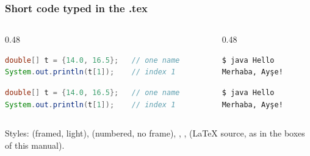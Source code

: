 \documentclass[aspectratio=169,10pt,compress]{beamer}
\begin{document}




\begin{frame}[t,fragile] \frametitle{Short code typed in the .tex}
	\begin{columns}[T]
		\begin{column}{0.48\textwidth}

\begin{texcode}
\begin{lstlisting}[style=codesnippet, language=Java]
double[] t = {14.0, 16.5};   // one name
System.out.println(t[1]);    // index 1
\end{lstlisting}
\end{texcode}

\begin{lstlisting}[style=codesnippet, language=Java]
double[] t = {14.0, 16.5};   // one name
System.out.println(t[1]);    // index 1
\end{lstlisting}

		\end{column}
		\begin{column}{0.48\textwidth}

\begin{texcode}
\begin{lstlisting}[style=terminalstyle,
  backgroundcolor=\color{termbg},
  basicstyle=\ttfamily\footnotesize\color{termfg}]
$ java Hello
Merhaba, Ayşe!
\end{lstlisting}
\end{texcode}

\begin{lstlisting}[style=terminalstyle, backgroundcolor=\color{termbg}, basicstyle=\ttfamily\footnotesize\color{termfg}]
$ java Hello
Merhaba, Ayşe!
\end{lstlisting}

		\end{column}
	\end{columns}

	\small Styles:  (framed, light),  (numbered, no frame),
	, ,  (LaTeX source, as in the boxes of this manual).
\end{frame}
\end{document}
